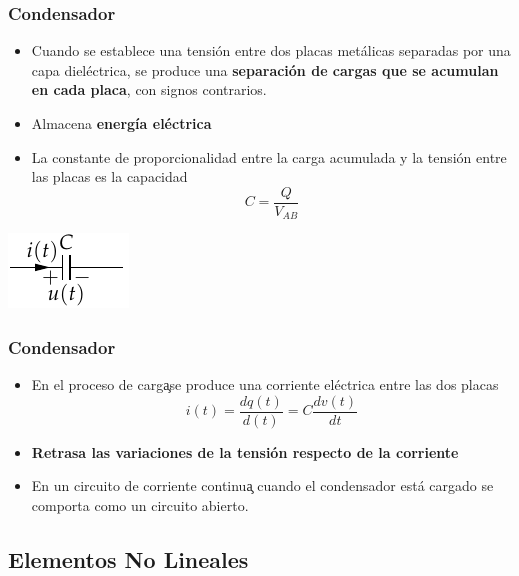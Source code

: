 \documentclass[serif, xcolor=dvipsnames]{beamer}
\begin{document}
\begin{frame}
  \frametitle{Condensador}
  \begin{itemize}
  \item Cuando se establece una tensión entre dos placas metálicas
    separadas por una capa dieléctrica, se produce una
    \textbf{separación de cargas que se acumulan en cada placa}, con
    signos contrarios.
  \item Almacena \textbf{energía eléctrica}
  \item La constante de proporcionalidad entre la carga acumulada y la
    tensión entre las placas es la capacidad
    \[
    C=\frac{Q}{V_{AB}}
    \]

  \end{itemize}
  \begin{center}
    \includegraphics{../figs/Condensador}
    \par\end{center}


\end{frame}
\begin{frame}
  \frametitle{Condensador}
  \begin{itemize}
  \item En el proceso de carga\c{ }se produce una corriente eléctrica
    entre las dos placas
    \[
    i(t)=\frac{dq(t)}{d(t)}=C\frac{dv(t)}{dt}
    \]

  \item \textbf{Retrasa las variaciones de la tensión respecto de la
      corriente}
  \item En un circuito de corriente continua\c{ } cuando el
    condensador está cargado se comporta como un circuito abierto.
  \end{itemize}

\end{frame}

\subsection{Elementos No Lineales}
\end{document}
